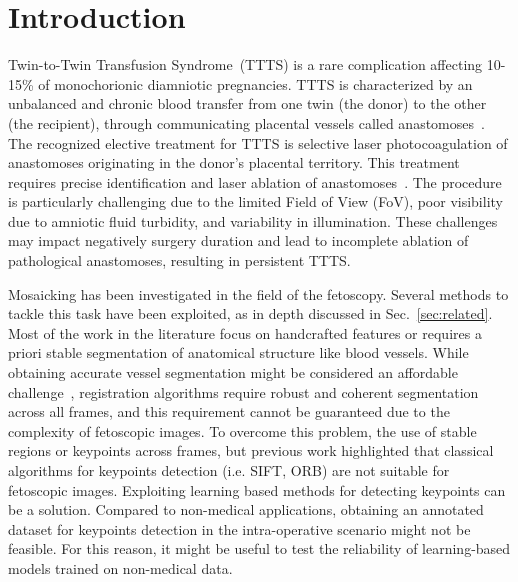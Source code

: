 \documentclass[sn-basic]{sn-jnl}%
\begin{document}
\section{Introduction}\label{sec:intro}
Twin-to-Twin Transfusion Syndrome~(TTTS) is a rare complication affecting 10-15\% of monochorionic diamniotic pregnancies. TTTS is characterized by an unbalanced and chronic blood transfer from one twin (the donor) to the other (the recipient), through communicating placental vessels called anastomoses~\citep{Baschat2011}.
The recognized elective treatment for TTTS is selective laser photocoagulation of anastomoses originating in the donor's placental territory. This treatment requires precise identification and laser ablation of anastomoses~\citep{beck2012preterm, Deprest2010}.
The procedure is particularly challenging due to the limited Field of View (FoV), poor visibility due to amniotic fluid turbidity, and variability in illumination. These challenges may impact negatively surgery duration and lead to incomplete ablation of pathological anastomoses, resulting in persistent TTTS.

Mosaicking has been investigated in the field of the fetoscopy. Several methods to tackle this task have been exploited, as in depth discussed in Sec.~\ref{sec:related}. Most of the work in the literature focus on handcrafted features or requires a priori stable segmentation of anatomical structure like blood vessels. 
While obtaining accurate vessel segmentation might be considered an affordable challenge~\citep{bano2021fetreg}, registration algorithms require robust and coherent segmentation across all frames, and this requirement cannot be guaranteed due to the complexity of fetoscopic images.
To overcome this problem, the use of stable regions or keypoints across frames, but previous work highlighted that classical algorithms for keypoints detection (i.e. SIFT, ORB) are not suitable for fetoscopic images. Exploiting learning based methods for detecting keypoints can be a solution.
Compared to non-medical applications, obtaining an annotated dataset for keypoints detection in the intra-operative scenario might not be feasible. For this reason, it might be useful to test the reliability of learning-based models trained on non-medical data.
\end{document}
